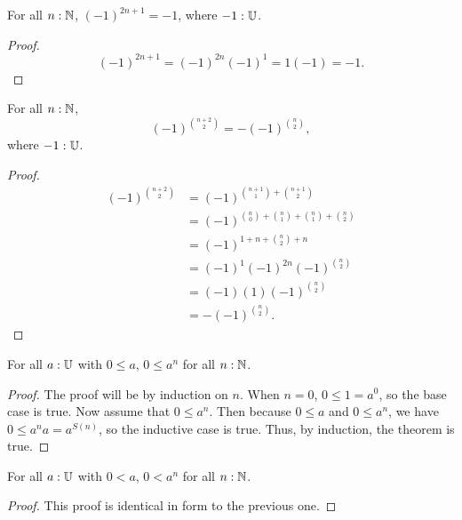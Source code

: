 \documentclass[../math.tex]{subfiles}
\begin{document}
\begin{theorem} \label{nat_pow_neg_odd}
    For all $n : \mathbb{N}$, $(-1)^{2n + 1} = -1$, where $-1 : \mathbb{U}$.
\end{theorem}
\begin{proof}
    \[
        (-1)^{2n + 1} = (-1)^{2n} (-1)^1 = 1 (-1) = -1.
    \]
\end{proof}

\begin{theorem} \label{nat_pow_neg_binom2}
    For all $n : \mathbb{N}$,
    \[
        (-1)^{\binom{n + 2}{2}} = -(-1)^{\binom{n}{2}},
    \]
    where $-1 : \mathbb{U}$.
\end{theorem}
\begin{proof}
    \begin{align*}
        (-1)^{\binom{n + 2}{2}}
        &= (-1)^{\binom{n + 1}{1} + \binom{n + 1}{2}} \\
        &= (-1)^{\binom{n}{0} + \binom{n}{1} + \binom{n}{1} + \binom{n}{2}} \\
        &= (-1)^{1 + n + \binom{n}{2} + n} \\
        &= (-1)^{1} (-1)^{2n} (-1)^{\binom{n}{2}} \\
        &= (-1) (1) (-1)^{\binom{n}{2}} \\
        &= -(-1)^{\binom{n}{2}}.
    \end{align*}
\end{proof}

\begin{theorem} \label{nat_pow_pos}
    For all $a : \mathbb{U}$ with $0 \leq a$, $0 \leq a^n$ for all $n : \mathbb{N}$.
\end{theorem}
\begin{proof}
    The proof will be by induction on $n$.  When $n = 0$, $0 \leq 1 = a^0$, so
    the base case is true.  Now assume that $0 \leq a^n$.  Then because $0 \leq
    a$ and $0 \leq a^n$, we have $0 \leq a^na = a^{S(n)}$, so the inductive case
    is true.  Thus, by induction, the theorem is true.
\end{proof}

\begin{theorem} \label{nat_pow_pos2}
    For all $a : \mathbb{U}$ with $0 < a$, $0 < a^n$ for all $n : \mathbb{N}$.
\end{theorem}
\begin{proof}
    This proof is identical in form to the previous one.
\end{proof}
\end{document}
